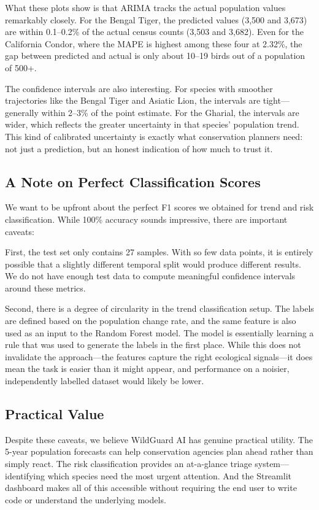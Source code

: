 \documentclass[conference]{IEEEtran}
\begin{document}
What these plots show is that ARIMA tracks the actual population values remarkably closely. For the Bengal Tiger, the predicted values (3,500 and 3,673) are within 0.1--0.2\% of the actual census counts (3,503 and 3,682). Even for the California Condor, where the MAPE is highest among these four at 2.32\%, the gap between predicted and actual is only about 10--19 birds out of a population of 500+.

The confidence intervals are also interesting. For species with smoother trajectories like the Bengal Tiger and Asiatic Lion, the intervals are tight---generally within 2--3\% of the point estimate. For the Gharial, the intervals are wider, which reflects the greater uncertainty in that species' population trend. This kind of calibrated uncertainty is exactly what conservation planners need: not just a prediction, but an honest indication of how much to trust it.

\subsection{A Note on Perfect Classification Scores}
We want to be upfront about the perfect F1 scores we obtained for trend and risk classification. While 100\% accuracy sounds impressive, there are important caveats:

First, the test set only contains 27 samples. With so few data points, it is entirely possible that a slightly different temporal split would produce different results. We do not have enough test data to compute meaningful confidence intervals around these metrics.

Second, there is a degree of circularity in the trend classification setup. The labels are defined based on the population change rate, and the same feature is also used as an input to the Random Forest model. The model is essentially learning a rule that was used to generate the labels in the first place. While this does not invalidate the approach---the features capture the right ecological signals---it does mean the task is easier than it might appear, and performance on a noisier, independently labelled dataset would likely be lower.

\subsection{Practical Value}
Despite these caveats, we believe WildGuard AI has genuine practical utility. The 5-year population forecasts can help conservation agencies plan ahead rather than simply react. The risk classification provides an at-a-glance triage system---identifying which species need the most urgent attention. And the Streamlit dashboard makes all of this accessible without requiring the end user to write code or understand the underlying models.
\end{document}
